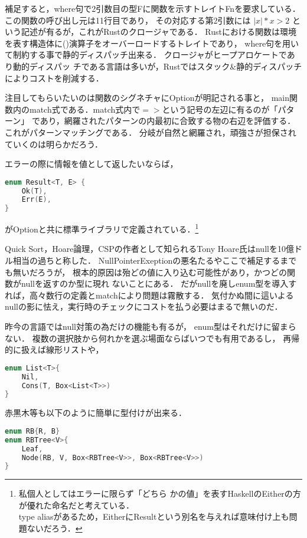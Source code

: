 補足すると，where句で2引数目の型Fに関数を示すトレイトFnを要求している．
この関数の呼び出し元は11行目であり，
その対応する第2引数には $|x| *x > 2$ という記述が有るが，これがRustのクロージャである．
Rustにおける関数は環境を表す構造体に()演算子をオーバーロードするトレイトであり，
where句を用いて制約する事で静的ディスパッチ出来る．
クロージャがヒープアロケートであり動的ディスパッ
チである言語は多いが，Rustではスタック\&静的ディスパッチによりコストを削減する．

注目してもらいたいのは関数のシグネチャにOptionが明記される事と，
main関数内のmatch式である．match式内で$=>$という記号の左辺に有るのが「パターン」
であり，網羅されたパターンの内最初に合致する物の右辺を評価する．これがパターンマッチングである．
分岐が自然と網羅され，頑強さが担保されていくのは明らかだろう．

エラーの際に情報を値として返したいならば，

\begin{lstlisting}[language={C++},caption=Result型,label=result_t]
enum Result<T, E> {
    Ok(T),
    Err(E),
}
\end{lstlisting}

がOptionと共に標準ライブラリで定義されている．\footnote{私個人としてはエラーに限らず「どちら
  かの値」を表すHaskellのEitherの方が優れた命名だと考えている． \\
  type aliasがあるため，EitherにResultという別名を与えれば意味付け上も問題ないだろう．}

Quick Sort，Hoare論理，CSPの作者として知られるTony Hoare氏はnullを10億ドル相当の過ちと称した．
NullPointerExeptionの悪名たるやここで補足するまでも無いだろうが，
根本的原因は殆どの値に入り込む可能性があり，かつどの関数がnullを返すのか型に現れ
ないことにある．
だがnullを廃しenum型を導入すれば，高々数行の定義とmatchにより問題は霧散する．
気付かぬ間に這いよるnullの影に怯え，実行時のチェックにコストを払う必要はまるで無いのだ．

昨今の言語ではnull対策の為だけの機能も有るが，
enum型はそれだけに留まらない．
複数の選択肢から何れかを選ぶ場面ならばいつでも有用であるし，
再帰的に扱えば線形リストや，

\begin{lstlisting}[language={C++},caption=線形リスト,label=list_t]
enum List<T>{
    Nil,
    Cons(T, Box<List<T>>)
}
\end{lstlisting}

赤黒木等も以下のように簡単に型付けが出来る．

\begin{lstlisting}[language={C++},caption=赤黒木,label=abt_t]
enum RB{R, B}
enum RBTree<V>{
    Leaf,
    Node(RB, V, Box<RBTree<V>>, Box<RBTree<V>>)
}
\end{lstlisting}

